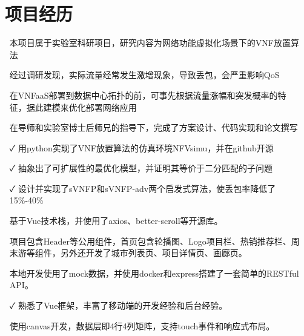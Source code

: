 \documentclass[14pt]{resume}
\begin{document}
\section{\faUsers\ 项目经历}

\begin{onehalfspacing}
\begin{itemize}
    \item[\faFlagO] 本项目属于实验室科研项目，研究内容为网络功能虚拟化场景下的VNF放置算法
    \item[\faFlagO] 经过调研发现，实际流量经常发生激增现象，导致丢包，会严重影响QoS
    \item[\faFlagO] 在VNFaaS部署到数据中心拓扑的前，可事先根据流量涨幅和突发概率的特征，据此建模来优化部署网络应用
    \item[\faCode] 在导师和实验室博士后师兄的指导下，完成了方案设计、代码实现和论文撰写
    \item[\faCheck] 用python实现了VNF放置算法的仿真环境NFVsimu，并在github开源
    \item[\faCheck] 抽象出了可扩展性的最优化模型，并证明其等价于二分匹配的子问题
    \item[\faCheck] 设计并实现了sVNFP和sVNFP-adv两个启发式算法，使丢包率降低了15\%-40\%
\end{itemize}
\end{onehalfspacing}

\begin{onehalfspacing}
\begin{itemize}
    \item[\faFlagO] 基于Vue技术栈，并使用了axios、better-scroll等开源库。
    \item[\faFlagO] 项目包含Header等公用组件，首页包含轮播图、Logo项目栏、热销推荐栏、周末游等组件，另外还开发了城市列表页、项目详情页、画廊页。
    \item[\faCode] 本地开发使用了mock数据，并使用docker和express搭建了一套简单的RESTful API。
    \item[\faCheck] 熟悉了Vue框架，丰富了移动端的开发经验和后台经验。
\end{itemize}
\end{onehalfspacing}

\begin{onehalfspacing}
\begin{itemize}
    \item[\faCode] 使用canvas开发，数据层即4行4列矩阵，支持touch事件和响应式布局。
\end{itemize}
\end{onehalfspacing}
\end{document}
